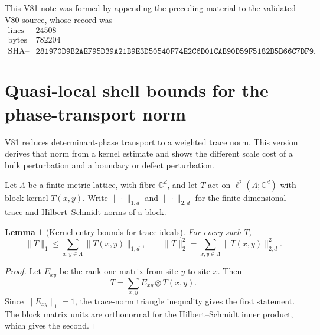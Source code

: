 \documentclass[11pt]{article}
\newtheorem{lemma}[theorem]{Lemma}
\begin{document}
This V81 note was formed by appending the preceding material to the
validated V80 source, whose record was
\[
\begin{array}{c|c}
\text{lines}&24508\\
\text{bytes}&782204\\
\text{SHA--256}&
\texttt{281970D9B2AEF95D39A21B9E3D50540F74E2C6D01CAB90D59F5182B5B66C7DF9}.
\end{array}                                                     \tag{81.18}
\]


\section{Quasi-local shell bounds for the phase-transport norm}
\label{sec:v11v82}

V81 reduces determinant-phase transport to a weighted trace norm.
This version derives that norm from a kernel estimate and shows the
different scale cost of a bulk perturbation and a boundary or defect
perturbation.

Let \(\Lambda\) be a finite metric lattice, with fibre
\(\mathbb C^d\), and let \(T\) act on
\(\ell^2(\Lambda;\mathbb C^d)\) with block kernel \(T(x,y)\).
Write \(\|\cdot\|_{1,d}\) and \(\|\cdot\|_{2,d}\) for the
finite-dimensional trace and Hilbert--Schmidt norms of a block.

\begin{lemma}[Kernel entry bounds for trace ideals]
\label{lem:v11v82-entry}
For every such \(T\),
\[
 \|T\|_1\le\sum_{x,y\in\Lambda}\|T(x,y)\|_{1,d},\qquad
 \|T\|_2^2=\sum_{x,y\in\Lambda}\|T(x,y)\|_{2,d}^2.            \tag{82.1}
\]
\end{lemma}

\begin{proof}
Let \(E_{xy}\) be the rank-one matrix from site \(y\) to site \(x\).
Then
\[
                         T=\sum_{x,y}E_{xy}\otimes T(x,y).
\]
Since \(\|E_{xy}\|_1=1\), the trace-norm triangle inequality gives the
first statement.  The block matrix units are orthonormal for the
Hilbert--Schmidt inner product, which gives the second.
\end{proof}
\end{document}

